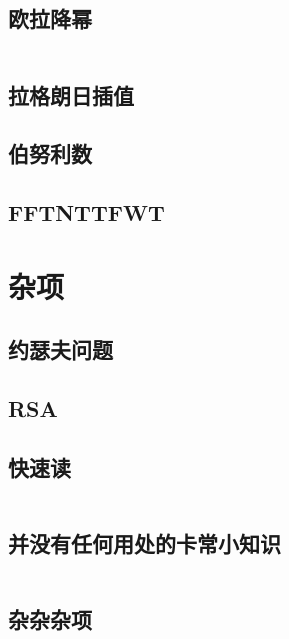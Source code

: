 \documentclass[a4paper,11pt]{article}
\begin{document}
    \subsection{欧拉降幂}
    \inputminted[breaklines]{c++}{Math/欧拉降幂.cpp}

    \subsection{拉格朗日插值}
    

    \subsection{伯努利数}
    

    \subsection{FFTNTTFWT}
    


    \newpage
    \section{杂项}

    \subsection{约瑟夫问题}
    

    \subsection{RSA}
    

    \subsection{快速读}
    \inputminted[breaklines]{c++}{Others/quick_IO.cpp}

    \subsection{并没有任何用处的卡常小知识}
    \inputminted[breaklines]{c++}{Others/并没有任何用处的卡常小知识.cpp}

    \subsection{杂杂杂项}
    
\end{document}

